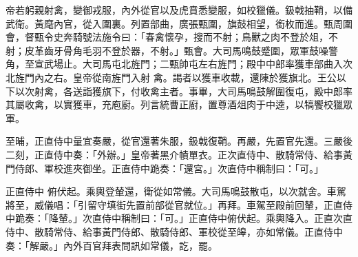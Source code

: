 \begin{pinyinscope}
 帝若躬親射禽，變御戎服，內外從官以及虎賁悉變服，如校獵儀。鈒戟抽鞘，以備武衛。黃麾內官，從入圍裏。列置部曲，廣張甄圍，旗鼓相望，銜枚而進。甄周圍會，督甄令史奔騎號法施令曰：「春禽懷孕，搜而不射；鳥獸之肉不登於俎，不射；皮革齒牙骨角毛羽不登於器，不射。」甄會。大司馬鳴鼓蹙圍，眾軍鼓噪警角，至宣武場止。大司馬屯北旌門；二甄帥屯左右旌門；殿中中郎率獲車部曲入次北旌門內之右。皇帝從南旌門入射
 禽。謁者以獲車收載，還陳於獲旗北。王公以下以次射禽，各送詣獲旗下，付收禽主者。事畢，大司馬鳴鼓解圍復屯，殿中郎率其屬收禽，以實獲車，充庖廚。列言統曹正廚，置尊酒俎肉于中逵，以犒饗校獵眾軍。



 至晡，正直侍中量宜奏嚴，從官還著朱服，鈒戟復鞘。再嚴，先置官先還。三嚴後二刻，正直侍中奏：「外辦。」皇帝著黑介幘單衣。正次直侍中、散騎常侍、給事黃門侍郎、軍校進夾御坐。正直侍中跪奏：「還宮。」次直侍中稱制曰：「可。」



 正直侍中
 俯伏起。乘輿登輦還，衛從如常儀。大司馬鳴鼓散屯，以次就舍。車駕將至，威儀唱：「引留守填街先置前部從官就位。」再拜。車駕至殿前回輦，正直侍中跪奏：「降輦。」次直侍中稱制曰：「可。」正直侍中俯伏起。乘輿降入。正直次直侍中、散騎常侍、給事黃門侍郎、散騎侍郎、軍校從至皞，亦如常儀。正直侍中奏：「解嚴。」內外百官拜表問訊如常儀，訖，罷。



\end{pinyinscope}